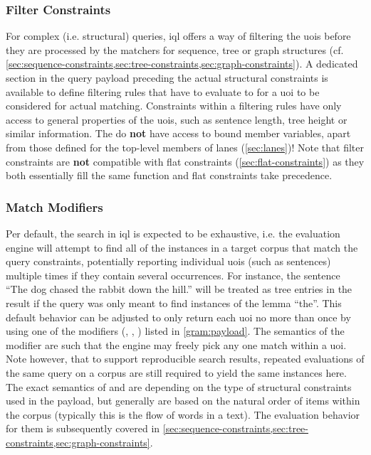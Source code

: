 \documentclass[11pt,a4paper]{article}
\begin{document}
\subsubsection{Filter Constraints}
\label{sec:filter-constraints}
\noindent For complex (i.e. structural) queries, \ac{iql} offers a way of filtering the \acp{uoi} before they are processed by the matchers for sequence, tree or graph structures (cf. \cref{sec:sequence-constraints,sec:tree-constraints,sec:graph-constraints}).
A dedicated  section in the query payload preceding the actual structural constraints is available to define filtering rules that have to evaluate to  for a \ac{uoi} to be considered for actual matching.
Constraints within a filtering rules have only access to general properties of the \acp{uoi}, such as sentence length, tree height or similar information.
The do \textbf{not} have access to bound member variables, apart from those defined for the top-level members of lanes (\ref{sec:lanes})!
Note that filter constraints are \textbf{not} compatible with flat constraints (\ref{sec:flat-constraints}) as they both essentially fill the same function and flat constraints take precedence.

\subsubsection{Match Modifiers}
\label{sec:match-modifiers}
Per default, the search in \ac{iql} is expected to be exhaustive, i.e. the evaluation engine will attempt to find all of the instances in a target corpus that match the query constraints, potentially reporting individual \acp{uoi} (such as sentences) multiple times  if they contain several occurrences.
For instance, the sentence ``The dog chased the rabbit down the hill.'' will be treated as tree entries in the result if the query was only meant to find instances of the lemma ``the''.
This default behavior can be adjusted to only return each \ac{uoi} no more than once by using one of the modifiers (, , ) listed in \cref{gram:payload}.
The semantics of the  modifier are such that the engine may freely pick any one match within a \ac{uoi}.
Note however, that to support reproducible search results, repeated evaluations of the same query on a corpus are still required to yield the same instances here.
The exact semantics of  and  are depending on the type of structural constraints used in the payload, but generally are based on the natural order of items within the corpus (typically this is the flow of words in a text).
The evaluation behavior for them is subsequently covered in \cref{sec:sequence-constraints,sec:tree-constraints,sec:graph-constraints}.
\end{document}
